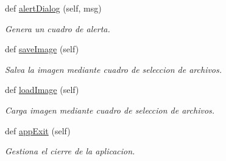 \begin{DoxyCompactItemize}
def \mbox{\hyperlink{classfacepi_1_1_face_pi_a32fcd9ee614d028b3722a0a18f07d03d}{alert\+Dialog}} (self, msg)
\begin{DoxyCompactList}\small\item\em Genera un cuadro de alerta. \end{DoxyCompactList}\item 
def \mbox{\hyperlink{classfacepi_1_1_face_pi_a28d7a48a53a13bfc501f3ee1de5e1968}{save\+Image}} (self)
\begin{DoxyCompactList}\small\item\em Salva la imagen mediante cuadro de seleccion de archivos. \end{DoxyCompactList}\item 
def \mbox{\hyperlink{classfacepi_1_1_face_pi_acaaf24b558c23d9c2831cbfc67e1fed7}{load\+Image}} (self)
\begin{DoxyCompactList}\small\item\em Carga imagen mediante cuadro de seleccion de archivos. \end{DoxyCompactList}\item 
def \mbox{\hyperlink{classfacepi_1_1_face_pi_a69e8a3b9b7df0e5b6fc00233debe46a7}{app\+Exit}} (self)
\begin{DoxyCompactList}\small\item\em Gestiona el cierre de la aplicacion. \end{DoxyCompactList}\end{DoxyCompactItemize}
